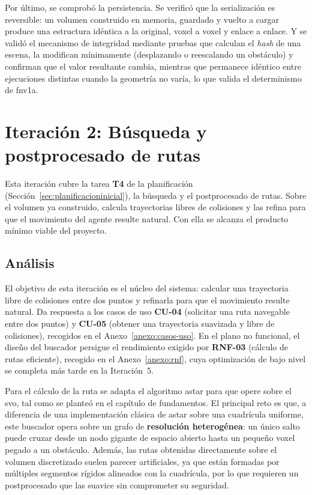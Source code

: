 Por último, se comprobó la persistencia.
Se verificó que la serialización es reversible: un volumen construido en memoria, guardado y vuelto a cargar produce una estructura idéntica a la original, \gls{voxel} a \gls{voxel} y enlace a enlace.
Y se validó el mecanismo de integridad mediante pruebas que calculan el \textit{hash} de una escena, la modifican mínimamente (desplazando o reescalando un obstáculo) y confirman que el valor resultante cambia, mientras que permanece idéntico entre ejecuciones distintas cuando la geometría no varía, lo que valida el determinismo de \gls{fnv1a}.

\section{Iteración 2: Búsqueda y postprocesado de rutas}
\label{sec:iter-pathfinding}

Esta iteración cubre la tarea \textbf{T4} de la planificación (Sección~\ref{sec:planificacioninicial}), la búsqueda y el postprocesado de rutas.
Sobre el volumen ya construido, calcula trayectorias libres de colisiones y las refina para que el movimiento del agente resulte natural.
Con ella se alcanza el producto mínimo viable del proyecto.

\subsection{Análisis}

El objetivo de esta iteración es el núcleo del sistema: calcular una trayectoria libre de colisiones entre dos puntos y refinarla para que el movimiento resulte natural.
Da respuesta a los casos de uso \textbf{CU-04} (solicitar una ruta navegable entre dos puntos) y \textbf{CU-05} (obtener una trayectoria suavizada y libre de colisiones), recogidos en el Anexo~\ref{anexo:casos-uso}.
En el plano no funcional, el diseño del buscador persigue el rendimiento exigido por \textbf{RNF-03} (cálculo de rutas eficiente), recogido en el Anexo~\ref{anexo:rnf}, cuya optimización de bajo nivel se completa más tarde en la Iteración~5.

Para el cálculo de la ruta se adapta el algoritmo \gls{astar} para que opere sobre el \acrshort{svo}, tal como se planteó en el capítulo de fundamentos.
El principal reto es que, a diferencia de una implementación clásica de \gls{astar} sobre una cuadrícula uniforme, este buscador opera sobre un grafo de \textbf{resolución heterogénea}: un único salto puede cruzar desde un nodo gigante de espacio abierto hasta un pequeño \gls{voxel} pegado a un obstáculo.
Además, las rutas obtenidas directamente sobre el volumen discretizado suelen parecer artificiales, ya que están formadas por múltiples segmentos rígidos alineados con la cuadrícula, por lo que requieren un postprocesado que las suavice sin comprometer su seguridad.

